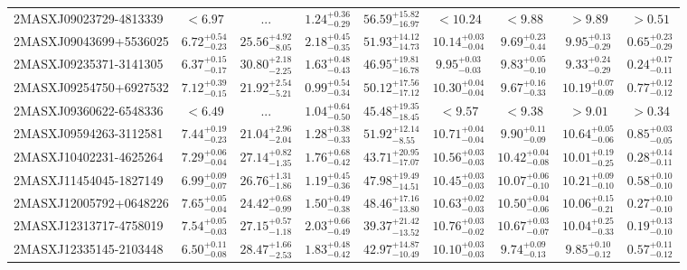 \documentclass[onecolumn]{mn2e}
\begin{document}
{\begin{center}
\begin{longtable}{lcccccccc}
2MASXJ09023729-4813339 & $<6.97$ & ... & $1.24_{-0.29}^{+0.36}$ &$56.59_{-16.97}^{+15.82}$ & $<10.24$ & $<9.88$ & $>9.89$ & $>0.51$ \\
2MASXJ09043699+5536025 & $6.72_{-0.23}^{+0.54}$ & $25.56_{-8.05}^{+4.92}$ & $2.18_{-0.35}^{+0.45}$ &$51.93_{-14.73}^{+14.12}$ & $10.14_{-0.04}^{+0.03}$ & $9.69_{-0.44}^{+0.23}$ & $9.95_{-0.29}^{+0.13}$ & $0.65_{-0.29}^{+0.23}$ \\
2MASXJ09235371-3141305 & $6.37_{-0.17}^{+0.15}$ & $30.80_{-2.25}^{+2.18}$ & $1.63_{-0.43}^{+0.48}$ &$46.95_{-16.78}^{+19.81}$ & $9.95_{-0.03}^{+0.03}$ & $9.83_{-0.10}^{+0.05}$ & $9.33_{-0.29}^{+0.24}$ & $0.24_{-0.11}^{+0.17}$ \\
2MASXJ09254750+6927532 & $7.12_{-0.15}^{+0.39}$ & $21.92_{-5.21}^{+2.54}$ & $0.99_{-0.34}^{+0.54}$ &$50.12_{-17.12}^{+17.56}$ & $10.30_{-0.04}^{+0.04}$ & $9.67_{-0.33}^{+0.16}$ & $10.19_{-0.09}^{+0.07}$ & $0.77_{-0.12}^{+0.12}$ \\
2MASXJ09360622-6548336 & $<6.49$ & ... & $1.04_{-0.50}^{+0.64}$ &$45.48_{-18.45}^{+19.35}$ & $<9.57$ & $<9.38$ & $>9.01$ & $>0.34$ \\
2MASXJ09594263-3112581 & $7.44_{-0.23}^{+0.19}$ & $21.04_{-2.04}^{+2.96}$ & $1.28_{-0.33}^{+0.38}$ &$51.92_{-8.55}^{+12.14}$ & $10.71_{-0.04}^{+0.04}$ & $9.90_{-0.09}^{+0.11}$ & $10.64_{-0.06}^{+0.05}$ & $0.85_{-0.05}^{+0.03}$ \\
2MASXJ10402231-4625264 & $7.29_{-0.04}^{+0.06}$ & $27.14_{-1.35}^{+0.82}$ & $1.76_{-0.42}^{+0.68}$ &$43.71_{-17.07}^{+20.95}$ & $10.56_{-0.03}^{+0.03}$ & $10.42_{-0.08}^{+0.04}$ & $10.01_{-0.25}^{+0.19}$ & $0.28_{-0.11}^{+0.14}$ \\
2MASXJ11454045-1827149 & $6.99_{-0.07}^{+0.09}$ & $26.76_{-1.86}^{+1.31}$ & $1.19_{-0.36}^{+0.45}$ &$47.98_{-14.51}^{+19.49}$ & $10.45_{-0.03}^{+0.03}$ & $10.07_{-0.10}^{+0.06}$ & $10.21_{-0.10}^{+0.09}$ & $0.58_{-0.10}^{+0.10}$ \\
2MASXJ12005792+0648226 & $7.65_{-0.04}^{+0.05}$ & $24.42_{-0.99}^{+0.68}$ & $1.50_{-0.38}^{+0.49}$ &$48.46_{-13.80}^{+17.16}$ & $10.63_{-0.03}^{+0.02}$ & $10.50_{-0.06}^{+0.04}$ & $10.06_{-0.21}^{+0.15}$ & $0.27_{-0.10}^{+0.10}$ \\
2MASXJ12313717-4758019 & $7.54_{-0.03}^{+0.05}$ & $27.15_{-1.18}^{+0.57}$ & $2.03_{-0.49}^{+0.66}$ &$39.37_{-13.52}^{+21.42}$ & $10.76_{-0.02}^{+0.03}$ & $10.67_{-0.07}^{+0.03}$ & $10.04_{-0.33}^{+0.25}$ & $0.19_{-0.10}^{+0.13}$ \\
2MASXJ12335145-2103448 & $6.50_{-0.08}^{+0.11}$ & $28.47_{-2.53}^{+1.66}$ & $1.83_{-0.42}^{+0.48}$ &$42.97_{-10.49}^{+14.87}$ & $10.10_{-0.03}^{+0.03}$ & $9.74_{-0.13}^{+0.09}$ & $9.85_{-0.12}^{+0.10}$ & $0.57_{-0.12}^{+0.11}$ \\

\end{longtable}
\end{center}}
\end{document}
